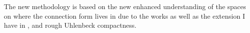 \documentclass[11pt]{article}
\numberwithin{equation}{section}
\theoremstyle{definition}
\theoremstyle{remark}
\newcommand{\1}{\mathbf 1}
\newcommand{\<}{\langle}
\renewcommand{\>}{\rangle}
\begin{document}
The new methodology is based on the new enhanced understanding of the spaces on where the connection form lives in due to the works \cite{Chevyrev19,CCHS2d} as well as the extension I have in , and rough Uhlenbeck compactness. 




\end{document}
